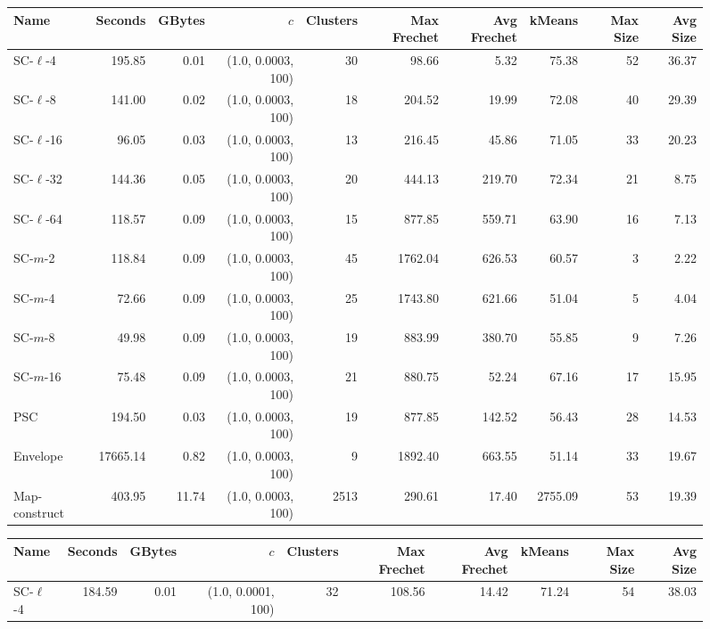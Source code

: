    \begin{figure} \begin{center}
    \begin{minipage}{\textwidth}
    {
    \begin{tabular}{@{}lrrrrrrrrr@{}}
        \toprule
        Name & Seconds & GBytes & $c$ & Clusters & Max Frechet & Avg Frechet & kMeans & Max Size & Avg Size\\
        \midrule
        SC-$\ell$-4 & 195.85 & 0.01 & (1.0, 0.0003, 100) & 30 & 98.66 & 5.32 & 75.38 & 52 & 36.37\\
SC-$\ell$-8 & 141.00 & 0.02 & (1.0, 0.0003, 100) & 18 & 204.52 & 19.99 & 72.08 & 40 & 29.39\\
SC-$\ell$-16 & 96.05 & 0.03 & (1.0, 0.0003, 100) & 13 & 216.45 & 45.86 & 71.05 & 33 & 20.23\\
SC-$\ell$-32 & 144.36 & 0.05 & (1.0, 0.0003, 100) & 20 & 444.13 & 219.70 & 72.34 & 21 & 8.75\\
SC-$\ell$-64 & 118.57 & 0.09 & (1.0, 0.0003, 100) & 15 & 877.85 & 559.71 & 63.90 & 16 & 7.13\\
SC-$m$-2 & 118.84 & 0.09 & (1.0, 0.0003, 100) & 45 & 1762.04 & 626.53 & 60.57 & 3 & 2.22\\
SC-$m$-4 & 72.66 & 0.09 & (1.0, 0.0003, 100) & 25 & 1743.80 & 621.66 & 51.04 & 5 & 4.04\\
SC-$m$-8 & 49.98 & 0.09 & (1.0, 0.0003, 100) & 19 & 883.99 & 380.70 & 55.85 & 9 & 7.26\\
SC-$m$-16 & 75.48 & 0.09 & (1.0, 0.0003, 100) & 21 & 880.75 & 52.24 & 67.16 & 17 & 15.95\\
PSC& 194.50 & 0.03 & (1.0, 0.0003, 100) & 19 & 877.85 & 142.52 & 56.43 & 28 & 14.53\\
Envelope & 17665.14 & 0.82 & (1.0, 0.0003, 100) & 9 & 1892.40 & 663.55 & 51.14 & 33 & 19.67\\
Map-construct & 403.95 & 11.74 & (1.0, 0.0003, 100) & 2513 & 290.61 & 17.40 & 2755.09 & 53 & 19.39\\
        \bottomrule
    \end{tabular}
    }
    {
    \begin{tabular}{@{}lrrrrrrrrr@{}}
        \toprule
        Name & Seconds & GBytes & $c$ & Clusters & Max Frechet & Avg Frechet & kMeans & Max Size & Avg Size\\
        \midrule
        SC-$\ell$-4 & 184.59 & 0.01 & (1.0, 0.0001, 100) & 32 & 108.56 & 14.42 & 71.24 & 54 & 38.03\\

\end{tabular}}
\end{minipage}
\end{center}
\end{figure}
